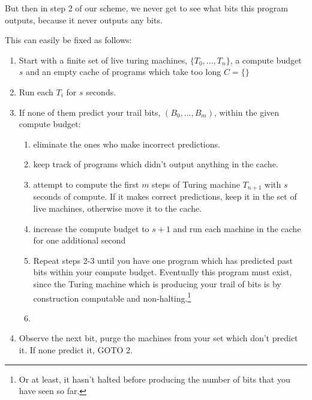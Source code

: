 \documentclass[12pt,authoryear]{elsarticle}
\begin{document}
But then in step 2 of our scheme, we never get to see what bits this program outputs, because it never outputs any bits.

This can easily be fixed as follows:

\begin{enumerate}
	\item Start with a finite set of live turing machines, $\{T_0, ..., T_n\}$, a compute budget $s$ and an empty cache of programs which take too long $C =\{\}$
	\item Run each $T_i$ for $s$ seconds. 
	\item If none of them predict your trail bits, $(B_0, ..., B_m)$, within the given compute budget: 
		\begin{enumerate}
		   \item eliminate the ones who make incorrect predictions.
			 \item keep track of programs which didn't output anything in the cache.
			 \item attempt to compute the first $m$ steps of Turing machine $T_{n+1}$ with $s$ seconds of compute. If it makes correct predictions, keep it in the set of live machines, otherwise move it to the cache.
			 \item increase the compute budget to $s + 1$ and run each machine in the cache for one additional second
			 \item Repeat steps 2-3 until you have one program which has predicted past bits within your compute budget. Eventually this program must exist, since the Turing machine which is producing your trail of bits is by construction computable and non-halting.\footnote{Or at least, it hasn't halted before producing the number of bits that you have seen so far.}
			\item 
		\end{enumerate}
	\item Observe the next bit, purge the machines from your set which don't predict it. If none predict it, GOTO 2.
\end{enumerate}
\end{document}
